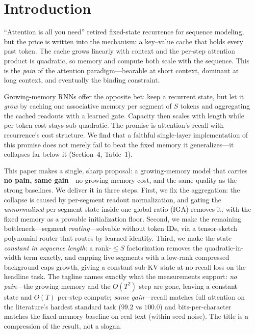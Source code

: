 \documentclass[11pt]{article}
\begin{document}
\section{Introduction}

``Attention is all you need'' \citep{vaswani2017attention} retired fixed-state
recurrence for sequence modeling, but the price is written into the mechanism: a
key--value cache that holds every past token. The cache grows linearly with
context and the per-step attention product is quadratic, so memory and compute
both scale with the sequence. This is the \emph{pain} of the attention
paradigm---bearable at short context, dominant at long context, and eventually
the binding constraint.

Growing-memory RNNs \citep{behrouz2026memorycaching} offer the opposite bet: keep a
recurrent state, but let it \emph{grow} by caching one associative memory per
segment of $S$ tokens and aggregating the cached readouts with a learned gate.
Capacity then scales with length while per-token cost stays sub-quadratic. The
promise is attention's recall with recurrence's cost structure. We find that a
faithful single-layer implementation of this promise does not merely fail to beat
the fixed memory it generalizes---it collapses far below it (Section~4, Table~1).

This paper makes a single, sharp proposal: a growing-memory model that carries
\textbf{no pain, same gain}---no growing-memory cost, and the same quality as the
strong baselines. We deliver it in three steps. First, we fix the aggregation: the
collapse is caused by per-segment readout normalization, and gating the
\emph{unnormalized} per-segment state inside one global ratio (IGA) removes it,
with the fixed memory as a provable initialization floor. Second, we make the
remaining bottleneck---segment \emph{routing}---solvable without token IDs, via a
tensor-sketch polynomial router that routes by learned identity. Third, we make
the state \emph{constant in sequence length}: a rank-$\le S$ factorization removes
the quadratic-in-width term exactly, and capping live segments with a low-rank
compressed background caps growth, giving a constant sub-KV state at no recall loss
on the headline task. The tagline names exactly what the measurements support:
\emph{no pain}---the growing memory and the $O(T^2)$ step are gone, leaving a
constant state and $O(T)$ per-step compute; \emph{same gain}---recall matches full
attention on the literature's hardest standard task ($99.2$ vs $100.0$) and
bits-per-character matches the fixed-memory baseline on real text (within seed
noise). The title is a compression of the result, not a slogan.
\end{document}
